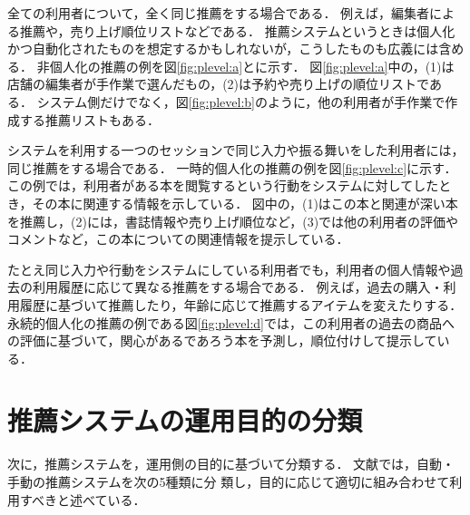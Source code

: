 \begin{description}[style=nextline]
\item[\term{非個人化}{no personalization}]
全ての利用者について，全く同じ推薦をする場合である．
例えば，編集者による推薦や，売り上げ順位リストなどである．
推薦システムというときは個人化かつ自動化されたものを想定するかもしれないが，こうしたものも広義には含める．
非個人化の推薦の例を図\ref{fig:plevel:a}とに示す．
図\ref{fig:plevel:a}中の，(1)は店舗の編集者が手作業で選んだもの，(2)は予約や売り上げの順位リストである．
システム側だけでなく，図\ref{fig:plevel:b}のように，他の利用者が手作業で作成する推薦リストもある．
\item[\term{一時的個人化}{ephemeral personalization}]
システムを利用する一つのセッションで同じ入力や振る舞いをした利用者には，同じ推薦をする場合である．
一時的個人化の推薦の例を図\ref{fig:plevel:c}に示す．
この例では，利用者がある本を閲覧するという行動をシステムに対してしたとき，その本に関連する情報を示している．
図中の，(1)はこの本と関連が深い本を推薦し，(2)には，書誌情報や売り上げ順位など，(3)では他の利用者の評価やコメントなど，この本についての関連情報を提示している．
\item[\term{永続的個人化}{persistent personalization}]
たとえ同じ入力や行動をシステムにしている利用者でも，利用者の個人情報や過去の利用履歴に応じて異なる推薦をする場合である．
例えば，過去の購入・利用履歴に基づいて推薦したり，年齢に応じて推薦するアイテムを変えたりする．
永続的個人化の推薦の例である図\ref{fig:plevel:d}では，この利用者の過去の商品への評価に基づいて，関心があるであろう本を予測し，順位付けして提示している．
\end{description}

\section{推薦システムの運用目的の分類}
\label{sec:systemtarget}

次に，推薦システムを，運用側の目的に基づいて分類する．
文献\cite{dmkd:01:01}では，自動・手動の推薦システムを次の5種類に分
類し，目的に応じて適切に組み合わせて利用すべきと述べている．

